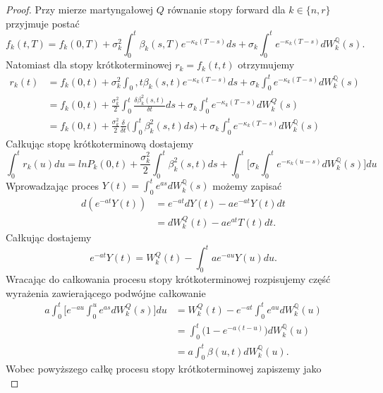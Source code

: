 \documentclass{mini}
\theoremstyle{mythstyle}
\begin{document}
	\begin{proof}
	Przy mierze martyngałowej $Q$ równanie stopy forward dla $k \in \{n, r\}$ przyjmuje postać
	\begin{equation}
		f_k(t,T) = f_k(0,T) + \sigma_k^2 \int_0^t \beta_k(s,T)e^{-\kappa_k(T-s)}ds + \sigma_k \int_0^t e^{-\kappa_k(T-s)}dW_k^\mathbb{Q}(s).
	\end{equation}
	Natomiast dla stopy krótkoterminowej $r_k = f_k(t, t)$ otrzymujemy
	\begin{align*}
		r_k(t) &= f_k(0,t) + \sigma_k^2 \int_0,t \beta_k(s,t) e^{-\kappa_k(T-s)}ds + \sigma_k \int_0^t e^{-\kappa_k(T-s)}dW_k^\mathbb{Q}(s)\\
		&= f_k(0,t) + \frac{\sigma_k^2}{2} \int_0^t \frac{\delta\beta_k^2(s,t)}{\delta t}ds + \sigma_k\int_0^t e^{-\kappa_k(T-s)}dW_k^Q(s)\\
		&= f_k(0,t) + \frac{\sigma_k^2}{2}\frac{\delta}{\delta t} \bigg(\int_0^t\beta_k^2(s, t)ds\bigg) + \sigma_k\int_0^t e^{-\kappa_k(T-s)}dW_k^\mathbb{Q}(s)
	\end{align*}
	Całkując stopę krótkoterminową dostajemy
	\begin{equation}
		\int_{0}^{t} r_k(u) du = ln P_k(0,t) + \frac{\sigma_k^2}{2} \int_{0}^{t} \beta^2_k(s,t) ds + \int_{0}^{t}\bigg[ \sigma_k \int_{0}^{t} e^{-\kappa_k(u-s)}dW_k^\mathbb{Q}(s)\bigg] du
	\end{equation}
	Wprowadzając proces $Y(t) = \int_{0}^{t}e^{as}dW_k^\mathbb{Q}(s)$ możemy zapisać
	\begin{align}
		d(e^{-at}Y(t)) &= e^{-at}dY(t) - ae^{-at}Y(t)dt \\
		&= dW_k^Q(t) - ae^{at}T(t)dt.
	\end{align}
	Całkując dostajemy
	\begin{equation}
		e^{-at}Y(t) = W_k^Q(t) - \int_{0}^{t} ae^{-au}Y(u) du.
	\end{equation}
	Wracając do całkowania procesu stopy krótkoterminowej rozpisujemy część wyrażenia zawierającego podwójne całkowanie
	\begin{align*}
		a\int_{0}^{t} \bigg[ e^{-au} \int_{0}^{u} e^{as}dW_k^Q(s) \bigg]du &= W_k^Q(t) - e^{-at}\int_{0}^{t} e^{au} dW_k^\mathbb{Q}(u) \\
		&= \int_{0}^{t} \bigg( 1 - e^{-a(t-u)}\bigg) dW_k^\mathbb{Q}(u) \\
		&= a \int_{0}^{t} \beta(u,t)dW_k^\mathbb{Q}(u).
	\end{align*}
	Wobec powyższego całkę procesu stopy krótkoterminowej zapiszemy jako
	\begin{equation}

\end{equation}
\end{proof}
\end{document}
